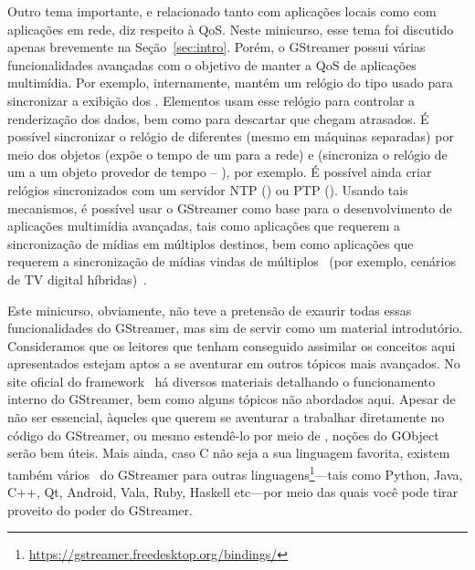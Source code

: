 Outro tema importante, e relacionado tanto com aplicações locais como com
aplicações em rede, diz respeito à QoS.  Neste minicurso, esse tema foi
discutido apenas brevemente na Seção~\ref{sec:intro}.  Porém, o GStreamer possui várias
funcionalidades avançadas com o objetivo de manter a QoS de aplicações
multimídia.  Por exemplo, internamente,  mantém um relógio do
tipo  usado para sincronizar a exibição dos .
Elementos  usam esse relógio para controlar a renderização dos dados,
bem como para descartar  que chegam atrasados. É possível
sincronizar o relógio de  diferentes (mesmo em máquinas
separadas) por meio dos objetos  (expõe o tempo de um
 para a rede) e  (sincroniza o relógio de um
 a um objeto provedor de tempo -- ), por
exemplo. É possível ainda criar relógios sincronizados com um servidor NTP
() ou PTP ().  Usando tais mecanismos, é possível
usar o GStreamer como base para o desenvolvimento de aplicações multimídia
avançadas, tais como aplicações que requerem a sincronização de mídias em
múltiplos destinos, bem como aplicações que requerem a sincronização de
mídias vindas de múltiplos ~(por exemplo, cenários de TV digital
híbridas)~\cite{Cesar-2016}.

Este minicurso, obviamente, não teve a pretensão de exaurir todas essas
funcionalidades do GStreamer, mas sim de servir como um material introdutório.
Consideramos que os leitores que tenham conseguido assimilar os conceitos aqui
apresentados estejam aptos a se aventurar em outros tópicos mais avançados.  No
site oficial do framework~\cite{gstreamer} há diversos materiais detalhando o
funcionamento interno do GStreamer, bem como alguns tópicos não abordados aqui.
Apesar de não ser essencial, àqueles que querem se aventurar a trabalhar 
diretamente no código do GStreamer, ou mesmo estendê-lo por meio de
, noções do  GObject~\cite{glib} serão bem úteis.  
Mais ainda, caso C não seja a sua linguagem favorita, existem também 
vários~ do GStreamer para outras
linguagens\footnote{\url{https://gstreamer.freedesktop.org/bindings/}}---tais 
como Python, Java, C++, Qt, Android, Vala, Ruby, Haskell etc---por meio das
quais você pode tirar proveito do poder do GStreamer.

